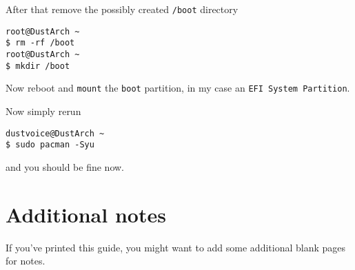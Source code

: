 \documentclass[9pt]{report}
\begin{document}
After that remove the possibly created \texttt{/boot} directory


\begin{verbatim}
root@DustArch ~
$ rm -rf /boot
root@DustArch ~
$ mkdir /boot
\end{verbatim}

Now reboot and \texttt{mount} the \texttt{boot} partition, in my case an \texttt{EFI System Partition}.


Now simply rerun


\begin{verbatim}
dustvoice@DustArch ~
$ sudo pacman -Syu
\end{verbatim}

and you should be fine now.


\hypertarget{x-additional-notes}{\chapter{Additional notes}}
If you’ve printed this guide, you might want to add some additional blank pages for notes.
\end{document}
